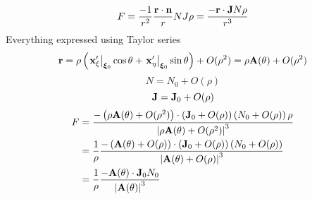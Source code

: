 \documentclass[a4paper,11pt]{article}
\begin{document}
\begin{equation}
F
= \frac{-1}{r^2} \frac{{\bf r} \cdot {\bf n}}{r} N J \rho
= \frac{-{\bf r} \cdot {\bf J} N \rho}{r^3}
\end{equation}
%
Everything expressed using Taylor series
%
\begin{equation}
{\bf r} = \rho \left(
\left.{\bf x}'_{\xi}\right|_{\bm{\xi}_0} \cos \theta
+
\left.{\bf x}'_{\eta}\right|_{\bm{\xi}_0} \sin \theta
\right)
+ O(\rho^2)
=
\rho {\bf A}(\theta) + O(\rho^2)
\end{equation}
%
\begin{equation}
N = N_0 + O(\rho)
\end{equation}
%
\begin{equation}
{\bf J} = {\bf J}_0 + O(\rho)
\end{equation}
%
\begin{align}
F
&= \frac{-\left(\rho {\bf A}(\theta) + O(\rho^2)\right)
\cdot
\left( {\bf J}_0 + O(\rho)\right)
\left(N_0 + O(\rho)\right) \rho}{\left|\rho {\bf A}(\theta) + O(\rho^2)\right|^3} \\
&= \frac{1}{\rho}
\frac{-\left({\bf A}(\theta) + O(\rho)\right)
\cdot
\left( {\bf J}_0 + O(\rho)\right)
\left(N_0 + O(\rho)\right)}{\left|{\bf A}(\theta) + O(\rho)\right|^3} \\
&= \frac{1}{\rho}
\frac{-{\bf A}(\theta) \cdot {\bf J}_0 N_0}{\left|{\bf A}(\theta)\right|^3}
\end{align}
\end{document}
